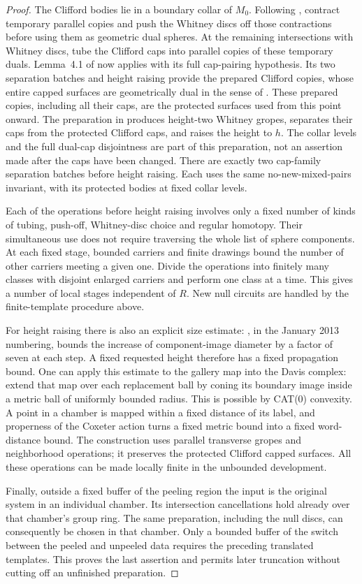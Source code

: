 \begin{proof}
The Clifford bodies lie in a boundary collar of $M_0$.  Following
\cite[Section~5]{PRT}, contract temporary parallel copies and push the
Whitney discs off those contractions before using them as geometric
dual spheres.  At the remaining intersections with Whitney discs,
tube the Clifford caps into parallel copies of these temporary duals.
Lemma~4.1 of \cite{PRT}
now applies with its full cap-pairing hypothesis.  Its two separation
batches and height raising provide the prepared Clifford copies,
whose entire capped surfaces are geometrically dual in the sense of
\cite[Definition~3.1]{PRT}.  These prepared copies, including all their
caps, are the protected surfaces used from this point onward.
The preparation in \cite[Lemma~4.1]{PRT} produces height-two Whitney
gropes, separates their caps from the protected Clifford caps, and
raises the height to $h$. The collar levels and the full dual-cap
disjointness are part of this preparation, not an assertion made after
the caps have been changed.
There are exactly two cap-family separation batches before height
raising.  Each uses the same no-new-mixed-pairs invariant, with its
protected bodies at fixed collar levels.

Each of the operations before height raising involves only a fixed
number of kinds of tubing, push-off, Whitney-disc choice and regular
homotopy.  Their simultaneous use does not require traversing the
whole list of sphere components.  At each fixed stage, bounded
carriers and finite drawings bound the number of other carriers
meeting a given one.  Divide the operations into finitely many
classes with disjoint enlarged carriers and perform one class at a
time.  This gives a number of local stages independent of $R$.
New null circuits are handled by the finite-template procedure above.

For height raising there is also an explicit size estimate:
\cite[Section~2.8.3]{FQ}, in the January 2013 numbering, bounds the
increase of component-image diameter by a factor of seven at each
step.  A fixed requested height therefore has a fixed propagation
bound.  One can apply this estimate to the gallery map into the
Davis complex: extend that map over each replacement ball by coning
its boundary image inside a metric ball of uniformly bounded radius.
This is possible by CAT(0) convexity.  A point in a chamber is mapped
within a fixed distance of its label, and properness of the Coxeter
action turns a fixed metric bound into a fixed word-distance bound.
The construction uses parallel transverse gropes and
neighborhood operations; it preserves the protected Clifford capped
surfaces.  All these operations can be made locally finite in the
unbounded development.

Finally, outside a fixed buffer of the peeling region the input is
the original system in an individual chamber.  Its intersection
cancellations hold already over that chamber's group ring.  The same
preparation, including the null discs, can consequently be chosen in
that chamber.  Only a bounded buffer of the switch between the
peeled and unpeeled data requires the preceding translated templates.
This proves the last assertion and permits later truncation without
cutting off an unfinished preparation.
\end{proof}

